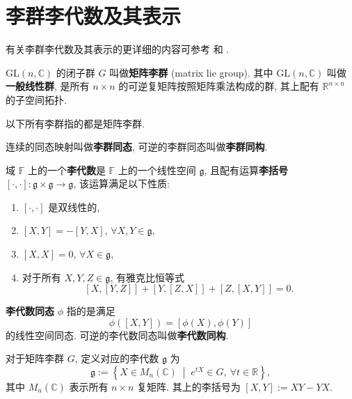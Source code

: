 \chapter{李群李代数及其表示}
\label{lie}
有关李群李代数及其表示的更详细的内容可参考 \cite[第 $ 16 $ 章]{hall2013quantum} 和 \cite{hall2013lie}.
\begin{definition}[矩阵李群]
    $ \mathrm{GL}(n,\mathbb{C}) $ 的闭子群 $ G $ 叫做{\bf 矩阵李群} (matrix lie group). 其中 $ \mathrm{GL}(n,\mathbb{C}) $ 叫做{\bf 一般线性群}, 是所有 $ n\times n $ 的可逆复矩阵按照矩阵乘法构成的群, 其上配有 $ \mathbb{R}^{n\times n} $ 的子空间拓扑.
\end{definition}
以下所有李群指的都是矩阵李群.
\begin{definition}
    连续的同态映射叫做{\bf 李群同态}, 可逆的李群同态叫做{\bf 李群同构}.
\end{definition}


\begin{definition}[李代数]
    域 $ \mathbb{F} $ 上的一个{\bf 李代数}是 $ \mathbb{F} $ 上的一个线性空间 $ \mathfrak{g} $, 且配有运算{\bf 李括号} $ [\cdot,\cdot]:\mathfrak{g}\times\mathfrak{g}\to\mathfrak{g} $, 该运算满足以下性质:
    \begin{enumerate}
        \item $ [\cdot,\cdot] $ 是双线性的,
        \item $ [X,Y]=-[Y,X] $, $ \forall X,Y\in\mathfrak{g} $,
        \item $ [X,X]=0 $, $ \forall X\in\mathfrak{g} $,
        \item 对于所有 $ X,Y,Z\in\mathfrak{g} $, 有雅克比恒等式
        \[ [X,[Y,Z]]+[Y,[Z,X]]+[Z,[X,Y]]=0. \]
    \end{enumerate}
\end{definition}
\begin{definition}
    {\bf 李代数同态} $ \phi $ 指的是满足
    \[ \phi([X,Y])=[\phi(X),\phi(Y)] \]
    的线性空间同态. 可逆的李代数同态叫做{\bf 李代数同构}.
\end{definition}
\begin{definition}
    对于矩阵李群 $ G $, 定义对应的李代数 $ \mathfrak{g} $ 为
    \[ \mathfrak{g}:=\left\{ X\in M_n(\mathbb{C}) \;\middle|\; e^{tX}\in G,\  \forall t\in\mathbb{R} \right\}, \]
    其中 $ M_n(\mathbb{C}) $ 表示所有 $ n\times n $ 复矩阵. 其上的李括号为 $ [X,Y]:=XY-YX $.
\end{definition}

